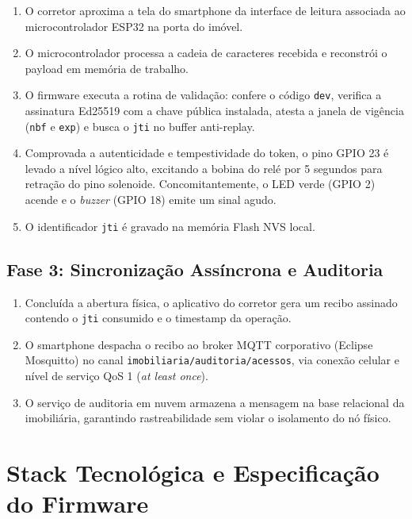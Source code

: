 \begin{enumerate}
    \item O corretor aproxima a tela do smartphone da interface de leitura associada ao microcontrolador ESP32 na porta do imóvel.
    \item O microcontrolador processa a cadeia de caracteres recebida e reconstrói o payload em memória de trabalho.
    \item O firmware executa a rotina de validação: confere o código \texttt{dev}, verifica a assinatura Ed25519 com a chave pública instalada, atesta a janela de vigência (\texttt{nbf} e \texttt{exp}) e busca o \texttt{jti} no buffer anti-replay.
    \item Comprovada a autenticidade e tempestividade do token, o pino GPIO 23 é levado a nível lógico alto, excitando a bobina do relé por 5 segundos para retração do pino solenoide. Concomitantemente, o LED verde (GPIO 2) acende e o \textit{buzzer} (GPIO 18) emite um sinal agudo.
    \item O identificador \texttt{jti} é gravado na memória Flash NVS local.
\end{enumerate}

\subsection{Fase 3: Sincronização Assíncrona e Auditoria}
\label{subsec:fluxo-fase-auditoria}

\begin{enumerate}
    \item Concluída a abertura física, o aplicativo do corretor gera um recibo assinado contendo o \texttt{jti} consumido e o timestamp da operação.
    \item O smartphone despacha o recibo ao broker MQTT corporativo (Eclipse Mosquitto) no canal \texttt{imobiliaria/auditoria/acessos}, via conexão celular e nível de serviço QoS 1 (\textit{at least once}).
    \item O serviço de auditoria em nuvem armazena a mensagem na base relacional da imobiliária, garantindo rastreabilidade sem violar o isolamento do nó físico.
\end{enumerate}

\section{Stack Tecnológica e Especificação do Firmware}
\label{sec:stack-tecnologica}

